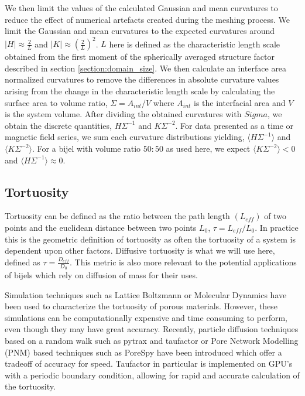 We then limit the values of the calculated Gaussian and mean curvatures to reduce the effect of numerical artefacts created during the meshing process. We 
limit the Gaussian and mean curvatures to the expected curvatures around $|H| \approx \frac{2}{L}$ and $|K| \approx (\frac{2}{L})^2$. $L$ here is defined 
as the characteristic length scale obtained from the first moment of the spherically averaged structure factor described in section \ref{section:domain_size}.  
We then calculate an interface area normalized curvatures to remove the differences in absolute curvature values arising from the change in the characteristic 
length scale by calculating the surface area to volume ratio, $\Sigma = A_{int}/V$ where $A_{int}$ is the interfacial area and $V$ is the system volume. After 
dividing the obtained curvatures with $Sigma$, we obtain the discrete quantities, $H \Sigma^{-1}$ and $K \Sigma^{-2}$. For data presented as a time or magnetic 
field series, we sum each curvature distributions yielding, $\langle H \Sigma^{-1} \rangle$ and $\langle K \Sigma^{-2} \rangle$. For a bijel with volume ratio 
$50:50$ as used here, we expect $\langle K \Sigma^{-2} \rangle < 0$ and $\langle H \Sigma^{-1} \rangle \approx 0$.

\subsection{Tortuosity}
\label{section:tortuosity}

Tortuosity can be defined as the ratio between the path length $(L_{eff})$ of two points and the euclidean distance 
between two points $L_{0}$, $\tau = L_{eff}/L_{0}$. In practice this is the geometric definition of tortuosity as 
often the tortuosity of a system is dependent upon other factors. Diffusive tortuosity is what we will use here, 
defined as $\tau = \frac{D_{eff}}{D_0}$. This metric is also more relevant to the potential applications of bijels 
which rely on diffusion of mass for their uses.

Simulation techniques such as Lattice Boltzmann or Molecular Dynamics have been used to characterize the tortuosity of 
porous materials. However, these simulations can be computationally expensive and time consuming to perform, even though 
they may have great accuracy. Recently, particle diffusion techniques based on a random walk such as pytrax and taufactor 
or Pore Network Modelling (PNM) based techniques such as PoreSpy have been introduced which offer a tradeoff of accuracy 
for speed. Taufactor in particular is implemented on GPU's with a periodic boundary condition, allowing for rapid and 
accurate calculation of the tortuosity.

